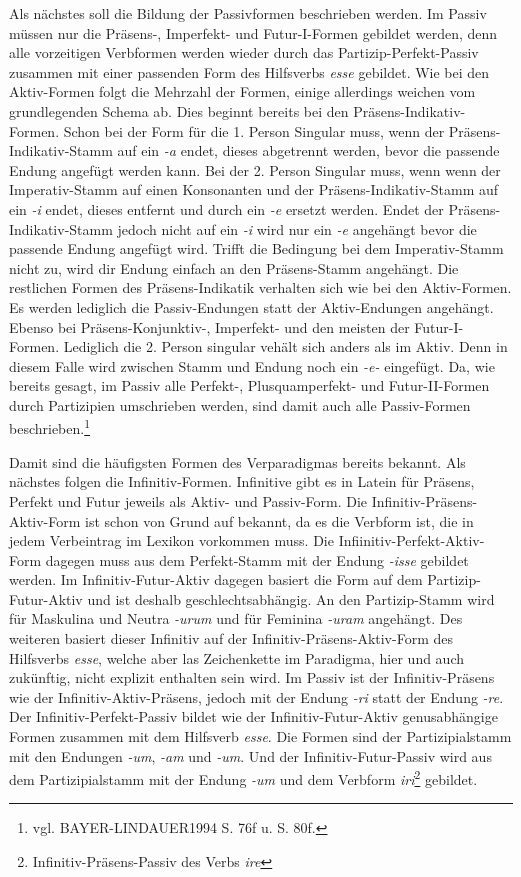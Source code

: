 \documentclass[12pt,abstract=on]{scrreprt}
\begin{document}
Als nächstes soll die Bildung der Passivformen beschrieben werden. Im Passiv müssen nur die Präsens-, Imperfekt- und Futur-I-Formen gebildet werden, denn alle vorzeitigen Verbformen werden wieder durch das Partizip-Perfekt-Passiv zusammen mit einer passenden Form des Hilfsverbs \textit{esse} gebildet. Wie bei den Aktiv-Formen folgt die Mehrzahl der Formen, einige allerdings weichen vom grundlegenden Schema ab. Dies beginnt bereits bei den Präsens-Indikativ-Formen. Schon bei der Form für die 1. Person Singular muss, wenn der Präsens-Indikativ-Stamm auf ein \textit{-a} endet, dieses abgetrennt werden, bevor die passende Endung angefügt werden kann. Bei der 2. Person Singular muss, wenn wenn der Imperativ-Stamm auf einen Konsonanten und der Präsens-Indikativ-Stamm auf ein \textit{-i} endet, dieses entfernt und durch ein \textit{-e} ersetzt werden. Endet der Präsens-Indikativ-Stamm jedoch nicht auf ein \textit{-i} wird nur ein \textit{-e} angehängt bevor die passende Endung angefügt wird. Trifft die Bedingung bei dem Imperativ-Stamm nicht zu, wird dir Endung einfach an den Präsens-Stamm angehängt. Die restlichen Formen des Präsens-Indikatik verhalten sich wie bei den Aktiv-Formen. Es werden lediglich die Passiv-Endungen statt der Aktiv-Endungen angehängt. Ebenso bei Präsens-Konjunktiv-, Imperfekt- und den meisten der Futur-I-Formen. Lediglich die 2. Person singular vehält sich anders als im Aktiv. Denn in diesem Falle wird zwischen Stamm und Endung noch ein \textit{-e-} eingefügt. Da, wie bereits gesagt, im Passiv alle Perfekt-, Plusquamperfekt- und Futur-II-Formen durch Partizipien umschrieben werden, sind damit auch alle Passiv-Formen beschrieben.\footnote{vgl. BAYER-LINDAUER1994 S. 76f u. S. 80f.} \par
Damit sind die häufigsten Formen des Verparadigmas bereits bekannt. Als nächstes folgen die Infinitiv-Formen. Infinitive gibt es in Latein für Präsens, Perfekt und Futur jeweils als Aktiv- und Passiv-Form. Die Infinitiv-Präsens-Aktiv-Form ist schon von Grund auf bekannt, da es die Verbform ist, die in jedem Verbeintrag im Lexikon vorkommen muss. Die Infiinitiv-Perfekt-Aktiv-Form dagegen muss aus dem Perfekt-Stamm mit der Endung \textit{-isse} gebildet werden. Im Infinitiv-Futur-Aktiv dagegen basiert die Form auf dem Partizip-Futur-Aktiv und ist deshalb geschlechtsabhängig. An den Partizip-Stamm wird für Maskulina und Neutra \textit{-urum} und für Feminina \textit{-uram} angehängt. Des weiteren basiert dieser Infinitiv auf der Infinitiv-Präsens-Aktiv-Form des Hilfsverbs \textit{esse}, welche aber las Zeichenkette im Paradigma, hier und auch zukünftig, nicht explizit enthalten sein wird. Im Passiv ist der Infinitiv-Präsens wie der Infinitiv-Aktiv-Präsens, jedoch mit der Endung \textit{-ri} statt der Endung \textit{-re}. Der Infinitiv-Perfekt-Passiv bildet wie der Infinitiv-Futur-Aktiv genusabhängige Formen zusammen mit dem Hilfsverb \textit{esse}. Die Formen sind der Partizipialstamm mit den Endungen \textit{-um}, \textit{-am} und \textit{-um}. Und der Infinitiv-Futur-Passiv wird aus dem Partizipialstamm mit der Endung \textit{-um} und dem Verbform \textit{iri}\footnote{Infinitiv-Präsens-Passiv des Verbs \textit{ire}} gebildet.\par
\end{document}

